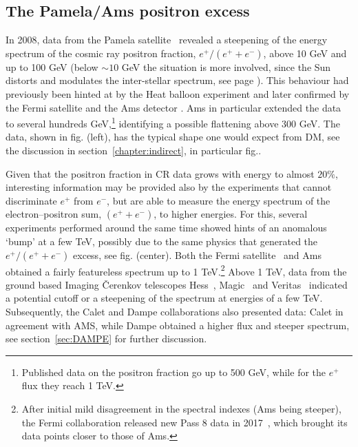 \subsection{The {\sc Pamela}/{\sc Ams} positron excess}\label{sec:positronexcess}
In 2008, data from the {\sc Pamela} satellite~\cite{Adriani:2008zr,Adriani:2010ib}  revealed a
steepening of the energy spectrum of the cosmic ray positron fraction, $e^+/(e^+ +e^-)$, above 10 GeV and up to 100 GeV 
(below $\sim10$ GeV the situation is more involved, since  the Sun distorts and modulates the inter-stellar spectrum, see page  \pageref{solar_modulation}). 
This behaviour had  previously been hinted at by the {\sc Heat} balloon experiment \cite{Barwick:1997ig} and 
later confirmed by the {\sc Fermi} satellite \cite{FermiLAT:2011ab} and the {\sc Ams} detector \cite{AMSpositrons2013,AMSpositrons2014}. 
{\sc Ams} in particular extended the data to several hundreds GeV,\footnote{Published data on the positron fraction go up to 500 GeV, while for the $e^+$ flux they reach 1 TeV.} identifying a possible flattening above 300 GeV.
The data, shown in fig. (left), has the typical shape one would expect from DM, see the discussion in section~\ref{chapter:indirect}, in particular
fig..





\smallskip

Given that the positron fraction in CR data grows with energy to almost $20\%$, interesting information may be provided
also by the experiments that cannot discriminate $e^+$ from $e^-$, but are able to measure
the  energy spectrum of the electron--positron sum, $(e^++e^-)$, to higher energies. For this, 
several experiments performed around the same time showed hints of an anomalous `bump' at a few TeV, 
possibly due to the same physics that generated the $e^+/(e^+ +e^-)$ excess, see  fig. (center).
Both the {\sc Fermi} satellite~\cite{FERMIleptons} and {\sc Ams}~\cite{Aguilar:2014fea} obtained a fairly featureless spectrum up to 1 TeV.\footnote{After initial mild disagreement in the spectral indexes ({\sc Ams} being steeper), the {\sc Fermi} collaboration released new Pass 8 data in 2017~\cite{Abdollahi:2017nat}, which brought its data points closer to those of {\sc Ams}.} 
Above 1 TeV, data from the ground based Imaging \v Cerenkov telescopes {\sc Hess}~\cite{HESSleptons}, {\sc Magic}~\cite{BorlaTridon:2011dk} and {\sc Veritas}~\cite{Staszak:2015kza} indicated a potential cutoff or a steepening of the spectrum at energies of a few TeV. Subsequently, the {\sc Calet} and {\sc Dampe} collaborations also presented data: {\sc Calet} in agreement with {\sc AMS}, while {\sc Dampe} obtained a higher flux and steeper spectrum, see section~\ref{sec:DAMPE} for further discussion. 


